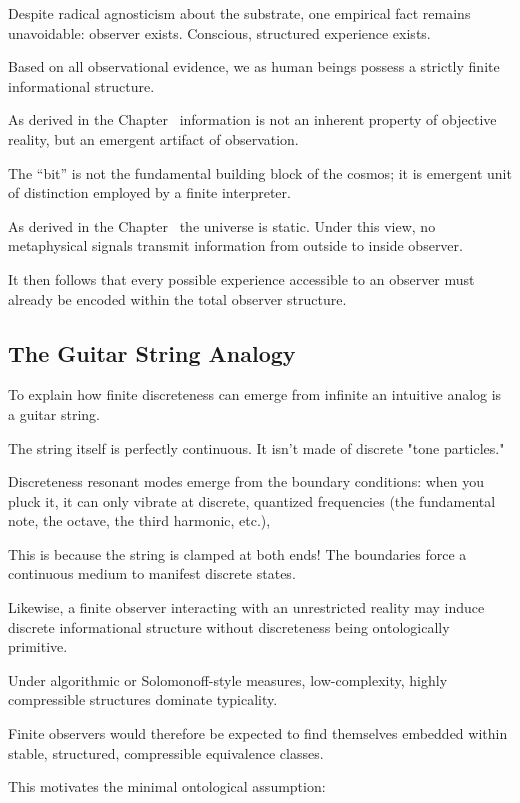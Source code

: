 Despite radical agnosticism about the substrate, one empirical fact remains unavoidable: observer exists. Conscious, structured  experience exists.

Based on all observational evidence, we as human beings possess a strictly finite informational structure.

As derived in the Chapter~ information is not an inherent property of objective reality, but an emergent artifact of observation.

The ``bit'' is not the fundamental building block of the cosmos; it is emergent unit of distinction employed by a finite interpreter.

As derived in the Chapter~ the universe is static.
Under this view, no metaphysical signals transmit information from outside to inside observer.

It then follows that every possible experience accessible to an observer must already be encoded within the total observer structure.


\subsection*{The Guitar String Analogy}

To explain how finite discreteness can emerge from infinite an intuitive analog is a guitar string.

The string itself is perfectly continuous. It isn't made of discrete "tone particles."

Discreteness resonant modes emerge from the boundary conditions: when you pluck it, it can only vibrate at discrete,
quantized frequencies (the fundamental note, the octave, the third harmonic, etc.), 

This is because the string is clamped at both ends! The boundaries force a continuous medium to manifest discrete states.

Likewise, a finite observer interacting with an unrestricted reality may induce discrete informational structure without discreteness being ontologically primitive.

Under algorithmic or Solomonoff-style measures, low-complexity, highly compressible structures dominate typicality.

Finite observers would therefore be expected to find themselves embedded within stable, structured, compressible equivalence classes.

This motivates the minimal ontological assumption:

